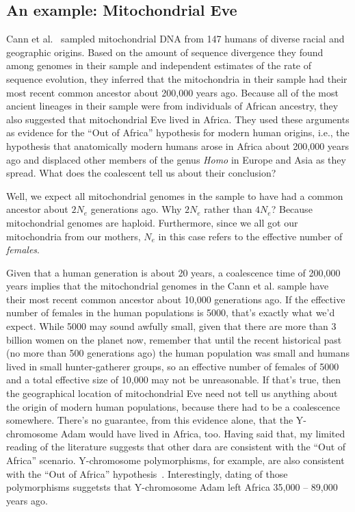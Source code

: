 \subsection*{An example: Mitochondrial
  Eve}

Cann et al.~\cite{Cann-etal-1987} sampled mitochondrial DNA from 147
humans of diverse racial and geographic origins. Based on the amount
of sequence divergence they found among genomes in their sample and
independent estimates of the rate of sequence evolution, they inferred
that the mitochondria in their sample had their most recent common
ancestor about 200,000 years ago. Because all of the most ancient
lineages in their sample were from individuals of African ancestry,
they also suggested that mitochondrial Eve lived in Africa. They used
these arguments as evidence for the ``Out of Africa'' hypothesis for
modern human origins, i.e., the hypothesis that anatomically modern
humans arose in Africa about 200,000 years ago and displaced other
members of the genus {\it Homo\/} in Europe and Asia as they
spread. What does the coalescent tell us about their conclusion?

Well, we expect all mitochondrial genomes in the sample to have had a
common ancestor about $2N_e$ generations ago. Why $2N_e$ rather than
$4N_e$? Because mitochondrial genomes are haploid. Furthermore, since
we all got our mitochondria from our mothers, $N_e$ in this case
refers to the effective number of {\it females}.

Given that a human generation is about 20 years, a coalescence time of
200,000 years implies that the mitochondrial genomes in the Cann et
al. sample have their most recent common ancestor about 10,000
generations ago. If the effective number of females in the human
populations is 5000, that's exactly what we'd expect. While 5000 may
sound awfully small, given that there are more than 3 billion women on
the planet now, remember that until the recent historical past (no
more than 500 generations ago) the human population was small and
humans lived in small hunter-gatherer groups, so an effective number
of females of 5000 and a total effective size of 10,000 may not be
unreasonable. If that's true, then the geographical location of
mitochondrial Eve need not tell us anything about the origin of modern
human populations, because there had to be a coalescence
somewhere. There's no guarantee, from this evidence alone, that the
Y-chromosome Adam would have lived in Africa, too. Having said that,
my limited reading of the literature suggests that other dara are
consistent with the ``Out of Africa'' scenario. Y-chromosome
polymorphisms, for example, are also consistent with the ``Out of
Africa'' hypothesis~\cite{Underhill-etal-2000}. Interestingly, dating
of those polymorphisms suggetsts that Y-chromosome Adam left Africa
35,000 -- 89,000 years ago.

